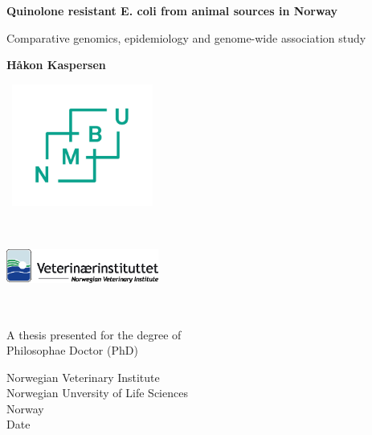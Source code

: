 \graphicspath{ {./images/} }
\begin{titlepage}
   \begin{center}
       \vspace*{1cm}
 
       \textbf{Quinolone resistant E. coli from animal sources in Norway}
 
       \vspace{0.5cm}
        Comparative genomics, epidemiology and genome-wide association study
 
       \vspace{1.5cm}
 
       \textbf{Håkon Kaspersen}
 
       \vspace{2cm}
       
       \includegraphics[height=4cm, width=5cm]{nmbu}
       
       \vspace{1.5cm}
       
       \includegraphics[height=3cm, width=5cm]{vetinst}
       
       \vfill
 
       A thesis presented for the degree of\\
       Philosophae Doctor (PhD)
 
       \vspace{0.8cm}
 
       Norwegian Veterinary Institute\\
       Norwegian Unversity of Life Sciences\\
       Norway\\
       Date
 
   \end{center}
\end{titlepage}
